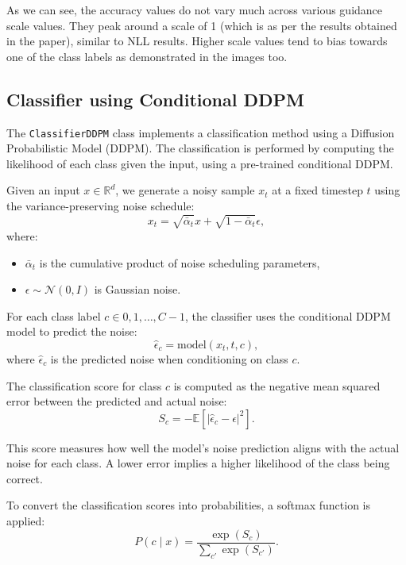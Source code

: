 \documentclass[a4paper,12pt]{article}
\begin{document}
As we can see, the accuracy values do not vary much across various guidance scale values. They peak around a scale of 1 (which is as per the results obtained in the paper), similar to NLL results. Higher scale values tend to bias towards one of the class labels as demonstrated in the images too. 




\subsection*{Classifier using Conditional DDPM}

The \texttt{ClassifierDDPM} class implements a classification method using a Diffusion Probabilistic Model (DDPM). The classification is performed by computing the likelihood of each class given the input, using a pre-trained conditional DDPM.

Given an input $x \in \mathbb{R}^d$, we generate a noisy sample $x_t$ at a fixed timestep $t$ using the variance-preserving noise schedule:
\begin{equation}
x_t = \sqrt{\bar{\alpha}_t} x + \sqrt{1 - \bar{\alpha}_t} \epsilon,
\end{equation}
where:
\begin{itemize}
\item $\bar{\alpha}_t$ is the cumulative product of noise scheduling parameters,
\item $\epsilon \sim \mathcal{N}(0, I)$ is Gaussian noise.
\end{itemize}


For each class label $c \in {0, 1, \dots, C-1}$, the classifier uses the conditional DDPM model to predict the noise:
\begin{equation}
\hat{\epsilon}_c = \text{model}(x_t, t, c),
\end{equation}
where $\hat{\epsilon}_c$ is the predicted noise when conditioning on class $c$.

The classification score for class $c$ is computed as the negative mean squared error between the predicted and actual noise:
\begin{equation}
S_c = -\mathbb{E} \left[ | \hat{\epsilon}_c - \epsilon |^2 \right].
\end{equation}

This score measures how well the model’s noise prediction aligns with the actual noise for each class. A lower error implies a higher likelihood of the class being correct.

To convert the classification scores into probabilities, a softmax function is applied:
\begin{equation}
P(c \mid x) = \frac{\exp(S_c)}{\sum_{c'} \exp(S_{c'})}.
\end{equation}
\end{document}
